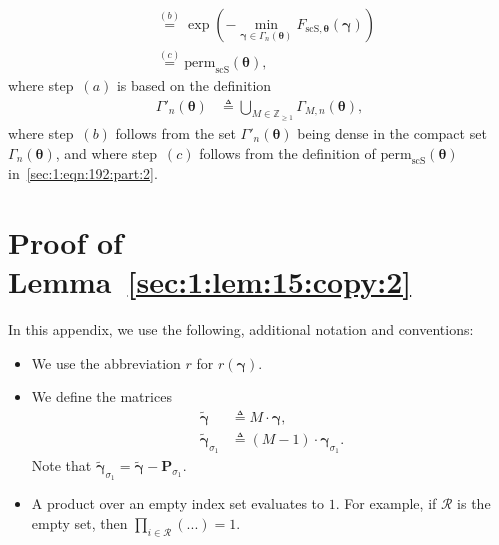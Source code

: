 \documentclass[journal,lettersize,twocolumn]{IEEEtran} %
\newcommand{\vect}[1]{ \bm{#1} }
\newcommand{\set}[1]{\mathcal{#1}}
\newcommand{\vgam}{ \vect{\gamma} }
\newcommand{\sZpp}{\mathbb{Z}_{\geq 1}}
\newcommand{\matr}[1]{ \bm{#1} }
\newcommand{\defeq}{ \triangleq }
\newcommand{\permscs}{ \mathrm{perm}_{\mathrm{scS}} }
\newcommand{\setR}{\set{R}}
\newcommand{\mtheta}{\matr{\theta}}
\newcommand{\tvgam}{\tilde{\vgam}}
\newcommand{\vtheta}{\matr{\theta}}
\newcommand{\mP}{\matr{P}}
\newcommand{\FscSthe}{F_{ \mathrm{scS}, \mtheta }}
\newcommand{\Gamnthe}{ \Gamma_{n}(\vtheta) }
\newcommand{\GamMnthe}{ \Gamma_{M,n}(\vtheta) }
\newcommand{\Gampnthe}{ \Gamma'_{n}(\vtheta) }
\begin{document}
\begin{appendices}
\begin{align*}
  &\overset{(b)}{=} 
     \exp
       \left(
         -
         \min_{ \vgam \in \Gamnthe }
           \FscSthe(\vgam)
       \right) \\
  &\overset{(c)}{=} 
     \permscs(\vtheta),
\end{align*}
where step~$(a)$ is based on the definition
\begin{align*}
  \Gampnthe
    &\defeq
       \bigcup_{M \in \sZpp}
         \GamMnthe,
\end{align*}
where step~$(b)$ follows from the set $\Gampnthe$ being dense in the compact
set $\Gamnthe$, and where step~$(c)$ follows from the definition of
$\permscs(\vtheta)$ in~\eqref{sec:1:eqn:192:part:2}.

%
%

\ifx\withclearpagecommands\x
\clearpage
\fi

\section{Proof of Lemma~\ref{sec:1:lem:15:copy:2}}
\label{app:sec:1:lem:15:copy:2}

%
%

In this appendix, we use the following, additional notation and conventions:
\begin{itemize}

\item We use the abbreviation $r$ for $r(\vgam)$.

\item We define the matrices
  \begin{align*}
    \tvgam
      &\defeq 
         M \cdot \vgam, \\ 
    \tvgam_{\sigma_1}
      &\defeq 
         (M-1) \cdot \vgam_{\sigma_1}.
  \end{align*}
  Note that $\tvgam_{\sigma_1} = \tvgam - \mP_{\sigma_1}$.

\item A product over an empty index set evaluates to $1$. For example, if
  $\setR$ is the empty set, then $\prod_{i \in \setR} (...) = 1$.

\end{itemize}

%
%


\end{appendices}
\end{document}
